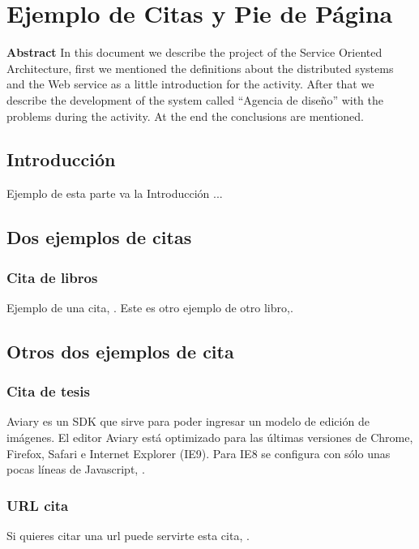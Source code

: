 \chapter{Ejemplo de Citas y Pie de Página}
\textbf{Abstract}
In this document we describe the project of the Service Oriented Architecture, first we mentioned the definitions about the distributed systems and the Web service as a little introduction for the activity. After that we describe the development of the system called “Agencia de diseño” with the problems during the activity. At the end the conclusions are mentioned.

\section{Introducción}

Ejemplo de esta parte va la Introducción ...



\section{Dos ejemplos de citas} 

\subsection{Cita de libros}
Ejemplo de una cita, \cite{Scambray00}.  
Este es otro ejemplo de otro libro,\cite{Kozierok05}. 



\section{Otros dos ejemplos de cita}

\subsection{Cita de tesis}
Aviary es un SDK que sirve para poder ingresar un modelo de edición de imágenes. El editor Aviary está optimizado para las últimas versiones de Chrome, Firefox, Safari e Internet Explorer (IE9). Para IE8 se configura  con sólo unas pocas líneas de Javascript, \cite{Lopez05}.

\subsection{URL cita}
Si quieres citar una url puede servirte esta cita, \cite{urlCiteVilar2013}.

